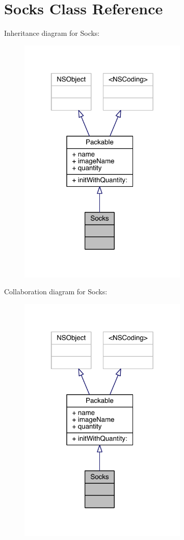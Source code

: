\hypertarget{interface_socks}{\section{Socks Class Reference}
\label{interface_socks}
}


Inheritance diagram for Socks\-:\nopagebreak
\begin{figure}[H]
\begin{center}
\leavevmode
\includegraphics[width=229pt]{interface_socks__inherit__graph}
\end{center}
\end{figure}


Collaboration diagram for Socks\-:\nopagebreak
\begin{figure}[H]
\begin{center}
\leavevmode
\includegraphics[width=229pt]{interface_socks__coll__graph}
\end{center}
\end{figure}
